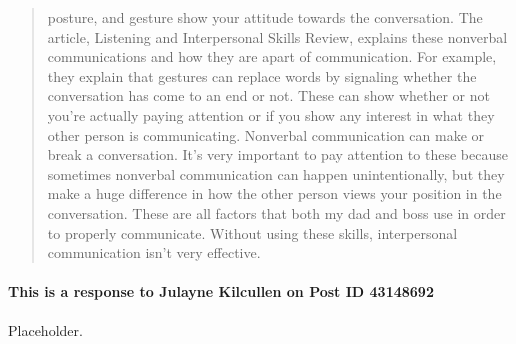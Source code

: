 \begin{quotation}
      posture, and gesture show your attitude towards the conversation. The
      article, Listening and Interpersonal Skills Review, explains these
      nonverbal communications and how they are apart of communication. For
      example, they explain that gestures can replace words by signaling whether
      the conversation has come to an end or not. These can show whether or not
      you're actually paying attention or if you show any interest in what they
      other person is communicating. Nonverbal communication can make or break a
      conversation. It's very important to pay attention to these because
      sometimes nonverbal communication can happen unintentionally, but they
      make a huge difference in how the other person views your position in the
      conversation. These are all factors that both my dad and boss use in order
      to properly communicate. Without using these skills, interpersonal
      communication isn't very effective.
  \end{quotation}

  \paragraph{This is a response to Julayne Kilcullen on Post ID 43148692}
    Placeholder.
